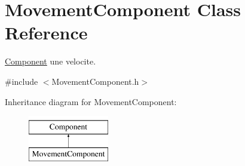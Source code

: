 \hypertarget{class_movement_component}{}\section{Movement\+Component Class Reference}
\label{class_movement_component}


\hyperlink{class_component}{Component} une velocite.  




{\ttfamily \#include $<$Movement\+Component.\+h$>$}

Inheritance diagram for Movement\+Component\+:\begin{figure}[H]
\begin{center}
\leavevmode
\includegraphics[height=2.000000cm]{class_movement_component}
\end{center}
\end{figure}
